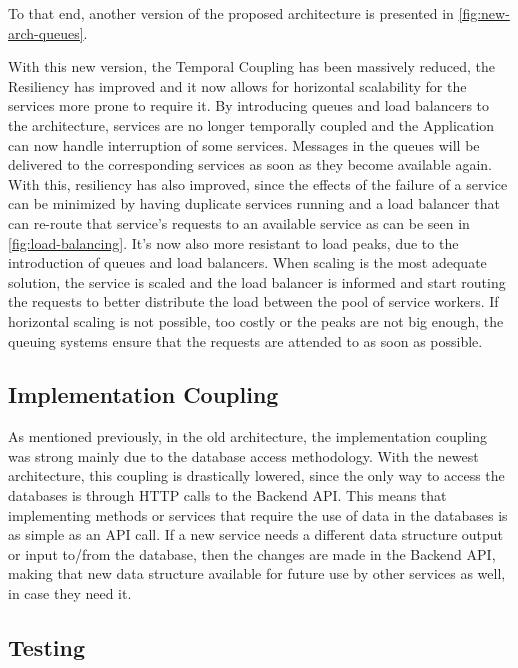 To that end, another version of the proposed architecture is presented in \cref{fig:new-arch-queues}. 



With this new version, the Temporal Coupling has been massively reduced, the Resiliency has improved and it now allows for horizontal scalability for the services more prone to require it.
By introducing queues and load balancers to the architecture, services are no longer temporally coupled and the Application can now handle interruption of some services. Messages in the queues will be delivered to the corresponding services as soon as they become available again. With this, resiliency has also improved, since the effects of the failure of a service can be minimized by having duplicate services running and a load balancer that can re-route that service's requests to an available service as can be seen in \cref{fig:load-balancing}. It's now also more resistant to load peaks, due to the introduction of queues and load balancers. When scaling is the most adequate solution, the service is scaled and the load balancer is informed and start routing the requests to better distribute the load between the pool of service workers. If horizontal scaling is not possible, too costly or the peaks are not big enough, the queuing systems ensure that the requests are attended to as soon as possible.


 

\subsection{Implementation Coupling}\label{methodology:sss:implementation-coupling}

As mentioned previously, in the old architecture, the implementation coupling was strong mainly due to the database access methodology. With the newest architecture, this coupling is drastically lowered, since the only way to access the databases is through HTTP calls to the Backend API. This means that implementing methods or services that require the use of data in the databases is as simple as an API call. If a new service needs a different data structure output or input to/from the database, then the changes are made in the Backend API, making that new data structure available for future use by other services as well, in case they need it.

\subsection{Testing}\label{methodology:sss:testing-new}

